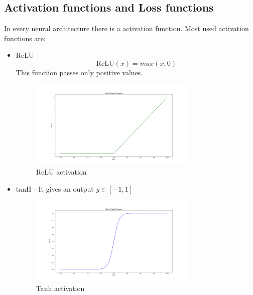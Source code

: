 \subsection{Activation functions and Loss functions}
In every neural architecture there is a activation function.
Most used activation functions are:
\begin{itemize}
	\item ReLU\\
	\begin{equation}
		\text{ReLU}(x) = max(x,0)
	\end{equation}
	This function passes only positive values.\\
	\begin{figure}[h!]
		\centering\includegraphics[width=8cm]{chapters/chapter2/relu}
		\caption{ReLU activation}
		\label{relu}
	\end{figure}
	\item tanH - It gives an output $y \in [-1,1]$\\
	\begin{figure}[h!]
		\centering\includegraphics[width=8cm]{chapters/chapter2/tanh}
		\caption{Tanh activation}
		\label{tanh}
	\end{figure}
\end{itemize} 

